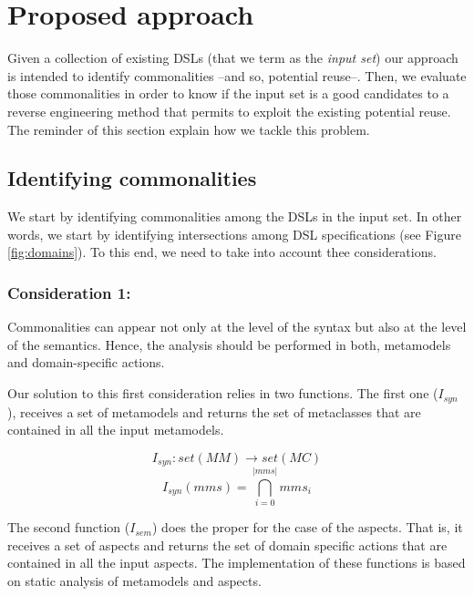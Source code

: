 \section{Proposed approach}

Given a collection of existing DSLs (that we term as the \textit{input set}) our approach is intended to identify commonalities --and so, potential reuse--. Then, we evaluate those commonalities in order to know if the input set is a good candidates to a reverse engineering method that permits to exploit the existing potential reuse. The reminder of this section explain how we tackle this problem.

\subsection{Identifying commonalities}
\label{sec:metrics}

We start by identifying commonalities among the DSLs in the input set. In other words, we start by identifying intersections among DSL specifications (see Figure \ref{fig:domains}). To this end, we need to take into account thee considerations.

\vspace{-2mm}
\subsubsection{Consideration 1:} Commonalities can appear not only at the level of the syntax but also at the level of the semantics. Hence, the analysis should be performed in both, metamodels and domain-specific actions.

Our solution to this first consideration relies in two functions. The first one ($I_{syn}$), receives a set of metamodels and returns the set of metaclasses that are contained in all the input metamodels. 

\begin{equation}
  I_{syn} : set(MM) \rightarrow set(MC)
\end{equation}
\vspace{-2mm}
\begin{equation}
  I_{syn}(mms) = \bigcap _{i=0}^{|mms|}mms_i
\end{equation}

The second function ($I_{sem}$) does the proper for the case of the aspects. That is, it receives a set of aspects and returns the set of domain specific actions that are contained in all the input aspects. The implementation of these functions is based on static analysis of metamodels and aspects.

